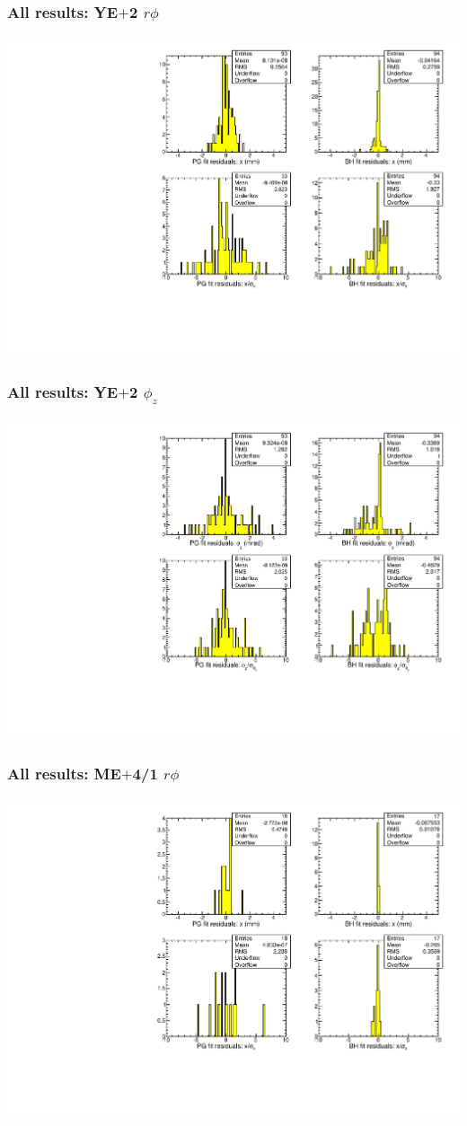 \documentclass[compress]{beamer}
\begin{document}
\begin{frame}
\frametitle{All results: YE$+$2 $r\phi$}
\includegraphics[width=\linewidth]{newplots_fitresiduals_YEp2_x.pdf}
\end{frame}
\begin{frame}
\frametitle{All results: YE$+$2 $\phi_z$}
\includegraphics[width=\linewidth]{newplots_fitresiduals_YEp2_phiz.pdf}
\end{frame}
\begin{frame}
\frametitle{All results: ME$+$4/1 $r\phi$}
\includegraphics[width=\linewidth]{newplots_fitresiduals_MEp4_1_x.pdf}
\end{frame}
\end{document}
